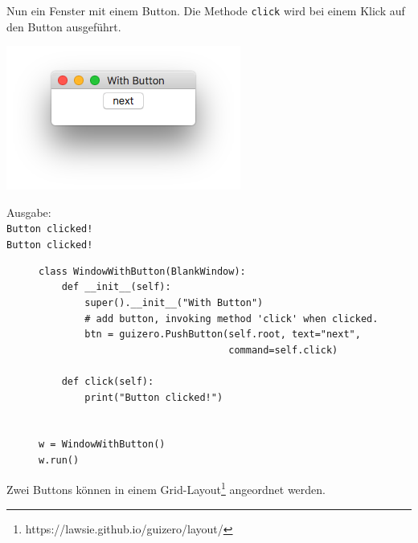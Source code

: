 \documentclass{tufte-handout}
\begin{document}
Nun ein Fenster mit einem Button. Die Methode \lstinline|click| wird bei einem
Klick auf den Button ausgeführt.

\begin{marginfigure}[3cm]
	\begin{center}
	\includegraphics[width=\textwidth]{../with_button.png}
	\end{center}
	
	Ausgabe:
	\texttt{\\
Button clicked!\\ 
Button clicked!
}

	
\end{marginfigure}

\begin{figure}
	\begin{lstlisting}
class WindowWithButton(BlankWindow):
    def __init__(self):
        super().__init__("With Button")
        # add button, invoking method 'click' when clicked.
        btn = guizero.PushButton(self.root, text="next", 
                                 command=self.click)

    def click(self):
        print("Button clicked!")


w = WindowWithButton()
w.run()   	\end{lstlisting}
\end{figure} 

\clearpage

Zwei Buttons können in einem
Grid-Layout\footnote{https://lawsie.github.io/guizero/layout/} angeordnet
werden.
\end{document}
